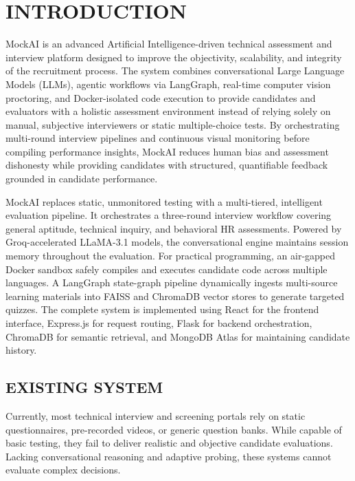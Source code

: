 \documentclass[12pt,a4paper]{report}
\begin{document}
\chapter{INTRODUCTION}
\setcounter{page}{1}

MockAI is an advanced Artificial Intelligence-driven technical assessment and interview
platform designed to improve the objectivity, scalability, and integrity of the recruitment
process. The system combines conversational Large Language Models (LLMs), agentic
workflows via LangGraph, real-time computer vision proctoring, and Docker-isolated code
execution to provide candidates and evaluators with a holistic assessment environment
instead of relying solely on manual, subjective interviewers or static multiple-choice tests.
By orchestrating multi-round interview pipelines and continuous visual monitoring before
compiling performance insights, MockAI reduces human bias and assessment dishonesty
while providing candidates with structured, quantifiable feedback grounded in candidate
performance.

MockAI replaces static, unmonitored testing with a multi-tiered, intelligent evaluation
pipeline. It orchestrates a three-round interview workflow covering general aptitude,
technical inquiry, and behavioral HR assessments. Powered by Groq-accelerated LLaMA-3.1
models, the conversational engine maintains session memory throughout the evaluation. For
practical programming, an air-gapped Docker sandbox safely compiles and executes
candidate code across multiple languages. A LangGraph state-graph pipeline dynamically
ingests multi-source learning materials into FAISS and ChromaDB vector stores to generate
targeted quizzes. The complete system is implemented using React for the frontend
interface, Express.js for request routing, Flask for backend orchestration, ChromaDB for
semantic retrieval, and MongoDB Atlas for maintaining candidate history.

\section{EXISTING SYSTEM}

Currently, most technical interview and screening portals rely on static questionnaires,
pre-recorded videos, or generic question banks. While capable of basic testing, they fail to
deliver realistic and objective candidate evaluations. Lacking conversational reasoning and
adaptive probing, these systems cannot evaluate complex decisions.
\end{document}
